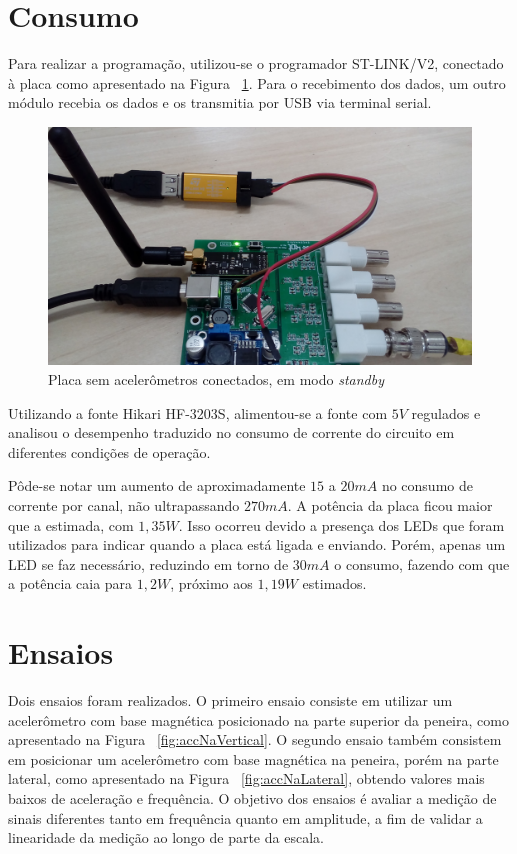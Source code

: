 \documentclass[
	12pt,				%
	openright,			%
	twoside,			%
	a4paper,			%
	english,			%
	french,				%
	spanish,			%
	brazil,				%
	]{abntex2}
\begin{document}
			\newpage

	\section{Consumo}
		Para realizar a programação, utilizou-se o programador
		ST-LINK/V2, conectado à placa como apresentado na Figura ~\ref{fig:accConectados}. Para
		o recebimento dos dados, um outro módulo recebia os dados e
		os transmitia por USB via terminal serial.

		\begin{figure}[!ht]
			\centering
			\includegraphics[width=\linewidth]{../Fotos/stlink.jpg}
			\caption{Placa sem acelerômetros conectados, em modo \textit{standby}}
			\label{fig:accConectados}
		\end{figure}

		Utilizando a fonte Hikari HF-3203S, alimentou-se a fonte com $5V$
		regulados e analisou o desempenho traduzido no consumo de
		corrente do circuito em diferentes condições de operação.

		Pôde-se notar um aumento de aproximadamente $15$ a $20mA$ no consumo
		de corrente por canal, não ultrapassando $270mA$. A potência da
		placa ficou maior que a estimada, com $1,35W$. Isso ocorreu devido
		a presença dos LEDs que foram utilizados para indicar quando a
		placa está ligada e enviando. Porém, apenas um LED se faz
		necessário, reduzindo em torno de $30mA$ o consumo, fazendo com
		que a potência caia para $1,2W$, próximo aos $1,19W$ estimados.

		\newpage

	\section{Ensaios}
		Dois ensaios foram realizados. O primeiro ensaio consiste em utilizar um acelerômetro com base magnética posicionado na parte superior da peneira, como apresentado na Figura ~\ref{fig:accNaVertical}. O segundo ensaio também consistem em posicionar um acelerômetro com base magnética na peneira, porém na parte lateral, como apresentado na Figura ~\ref{fig:accNaLateral}, obtendo valores mais baixos de aceleração e frequência. O objetivo dos ensaios é avaliar a medição de sinais diferentes tanto em frequência quanto em amplitude, a fim de validar a linearidade da medição ao longo de parte da escala.
		
\end{document}
